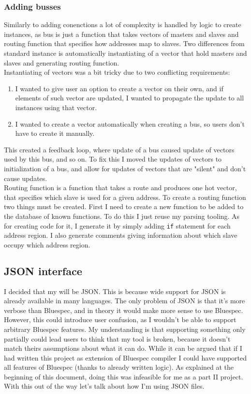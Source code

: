 \documentclass[14pt]{report}
\begin{document}
\subsubsection{Adding busses}
Similarly to adding conenctions a lot of complexity is handled by logic to create instances, as bus is just a function that takes vectors of masters and slaves and routing function that specifies how addresses map to slaves. Two differences from standard instance is automatically instantiating of a vector that hold masters and slaves and generating routing function. \\
Instantiating of vectors was a bit tricky due to two conflicting requirements:
\begin{enumerate}
    \item I wanted to give user an option to create a vector on their own, and if elements of such vector are updated, I wanted to propagate the update to all instances using that vector.
    \item I wanted to create a vector automatically when creating a bus, so users don't have to create it manually.
\end{enumerate} 
This created a feedback loop, where update of a bus caused update of vectors used by this bus, and so on. To fix this I moved the updates of vectors to initialization of a bus, and allow for updates of vectors that are "silent" and don't cause updates. 
\\
Routing function is a function that takes a route and produces one hot vector, that specifies which slave is used for a given address. 
To create a routing function two things must be created. First I need to create a new function to be added to the database of known functions. To do this I just reuse my parsing tooling. As for creating code for it, I generate it by simply adding \verb!if! statement for each address region. I also generate comments giving information about which slave occupy which address region.

\subsection*{JSON interface}
I decided that my  will be JSON. This is because wide support for JSON is already available in many languages. The only problem of JSON is that it's more verbose than Bluespec, and in theory it would make more sense to use Bluespec. However, this could introduce user confusion, as I wouldn't be able to support arbitrary Bluespec features. My understanding is that supporting something only partially could lead users to think that my tool is broken, because it doesn't match theirs assumptions about what it can do. While it can be argued that if I had written this project as extension of Bluespec compiler I could have supported all features of Bluespec (thanks to already written logic). As explained at the beginning of this document, doing this was infeasible for me as a part II project. \\
With this out of the way let's talk about how I'm using JSON files.
\end{document}

